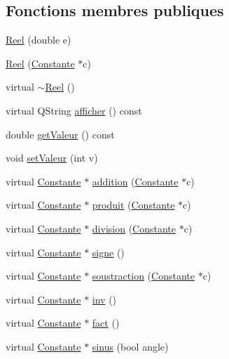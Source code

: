 \subsection*{\-Fonctions membres publiques}
\begin{DoxyCompactItemize}
\item 
\hyperlink{class_reel_ac186094d182a46f84199deabf90cbd0e}{\-Reel} (double e)
\item 
\hyperlink{class_reel_a02f5d2d30d048ae139b1d8112f6c6f9a}{\-Reel} (\hyperlink{class_constante}{\-Constante} $\ast$c)
\item 
virtual \hyperlink{class_reel_ac86835592eeeb54a8d4ce31fae3be10e}{$\sim$\-Reel} ()
\item 
virtual \-Q\-String \hyperlink{class_reel_a01af7b4e76fb88a85796a41f63b00420}{afficher} () const 
\item 
double \hyperlink{class_reel_a6412ad4d84dcd302c1fae1f7ec3ede46}{get\-Valeur} () const 
\item 
void \hyperlink{class_reel_ae2ce4ae994a0fb3762eea2eb854af5cd}{set\-Valeur} (int v)
\item 
virtual \hyperlink{class_constante}{\-Constante} $\ast$ \hyperlink{class_reel_a916d41fd6be293e13db43ef0a7866f40}{addition} (\hyperlink{class_constante}{\-Constante} $\ast$c)
\item 
virtual \hyperlink{class_constante}{\-Constante} $\ast$ \hyperlink{class_reel_ad87571a6e4d315eef54b55e6ded1f8f5}{produit} (\hyperlink{class_constante}{\-Constante} $\ast$c)
\item 
virtual \hyperlink{class_constante}{\-Constante} $\ast$ \hyperlink{class_reel_af82effc61166bcc5f2ed9d0a2c97bee1}{division} (\hyperlink{class_constante}{\-Constante} $\ast$c)
\item 
virtual \hyperlink{class_constante}{\-Constante} $\ast$ \hyperlink{class_reel_aec5959f07be6fdce8e87d58c1fa97a59}{signe} ()
\item 
virtual \hyperlink{class_constante}{\-Constante} $\ast$ \hyperlink{class_reel_a3c53208d46d2139790598fc5a7f29b7d}{soustraction} (\hyperlink{class_constante}{\-Constante} $\ast$c)
\item 
virtual \hyperlink{class_constante}{\-Constante} $\ast$ \hyperlink{class_reel_ac2388aae44a03e17a80efaf322583784}{inv} ()
\item 
virtual \hyperlink{class_constante}{\-Constante} $\ast$ \hyperlink{class_reel_a93cccda34883afa19ea08f9e84a6d22e}{fact} ()
\item 
virtual \hyperlink{class_constante}{\-Constante} $\ast$ \hyperlink{class_reel_a189184ab88846b6d48e660a4308269cd}{sinus} (bool angle)

\end{DoxyCompactItemize}
